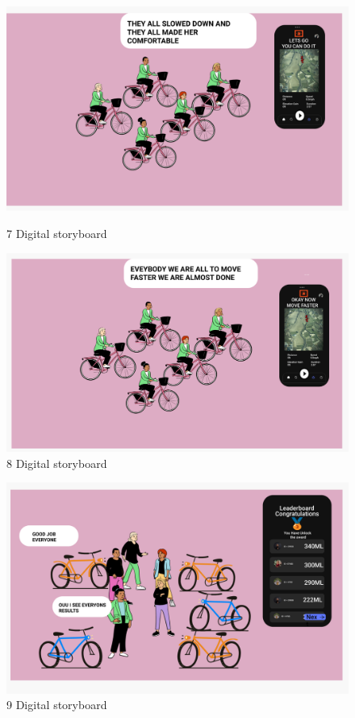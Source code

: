 \documentclass{l4proj}
\begin{document}
\begin{figure}
 \centering
 \begin{minipage}[b]{0.55\textwidth}
  \includegraphics[width=1\textwidth]{images/7.png}
  \caption{7 Digital storyboard}
 \end{minipage}%
 \begin{minipage}[b]{0.55\textwidth}
  \includegraphics[width=1\textwidth]{images/8.png}
  \caption{8 Digital storyboard}
 \end{minipage}
\end{figure}

\begin{figure}
 \centering
 \begin{minipage}[b]{0.55\textwidth}
  \includegraphics[width=1\textwidth]{images/9.png}
  \caption{9 Digital storyboard}
 \end{minipage}%
\end{figure}
\end{document}
